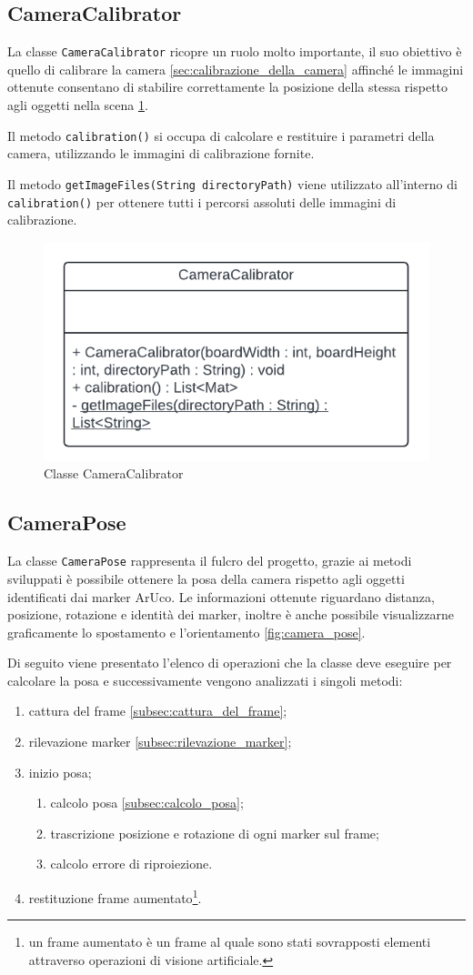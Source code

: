 \documentclass[12pt,a4paper,openright,twoside]{book}
\begin{document}
\subsection{CameraCalibrator}
La classe \texttt{CameraCalibrator} ricopre un ruolo molto importante, il suo obiettivo è quello di calibrare la camera \ref{sec:calibrazione_della_camera} affinché le immagini ottenute consentano di stabilire correttamente la posizione della stessa rispetto agli oggetti nella scena \ref{fig:camera_calibrator}.

Il metodo \texttt{calibration()} si occupa di calcolare e restituire i parametri della camera, utilizzando le immagini di calibrazione fornite.

Il metodo \texttt{getImageFiles(String directoryPath)} viene utilizzato all'interno di \texttt{calibration()} per ottenere tutti i percorsi assoluti delle immagini di calibrazione.
\begin{figure}[h!]
	\centering
	\includegraphics[width=0.5\linewidth]{./figures/UML/cameraCalibrator.pdf}
	\caption{Classe CameraCalibrator}
	\label{fig:camera_calibrator}
\end{figure}
\subsection{CameraPose} \label{camera_pose}
La classe \texttt{CameraPose} rappresenta il fulcro del progetto, grazie ai metodi sviluppati è possibile ottenere la posa della camera rispetto agli oggetti identificati dai marker ArUco. Le informazioni ottenute riguardano distanza, posizione, rotazione e identità dei marker, inoltre è anche possibile visualizzarne graficamente lo spostamento e l'orientamento \ref{fig:camera_pose}.

Di seguito viene presentato l'elenco di operazioni che la classe deve eseguire per calcolare la posa e successivamente vengono analizzati i singoli metodi:
\begin{enumerate}
	\item cattura del frame \ref{subsec:cattura_del_frame};
	\item rilevazione marker \ref{subsec:rilevazione_marker};
	\item inizio posa;
	\begin{enumerate}
		\item calcolo posa \ref{subsec:calcolo_posa};
		\item trascrizione posizione e rotazione di ogni marker sul frame;
		\item calcolo errore di riproiezione.
	\end{enumerate}
	\item restituzione frame aumentato\footnote{un frame aumentato è un frame al quale sono stati sovrapposti elementi attraverso operazioni di visione artificiale.}.
\end{enumerate}
\end{document}
